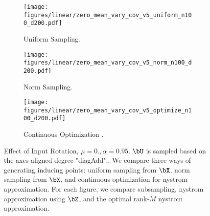 \begin{figure}[!htb]
\centering
\begin{subfigure}[b]{\textwidth}
       \texttt{[image: figures/linear/zero\_mean\_vary\_cov\_v5\_uniform\_n100\_d200.pdf]}
       \caption{Uniform Sampling.}
      \end{subfigure}
      \hspace{2em}
\begin{subfigure}[b]{\textwidth}
       \texttt{[image: figures/linear/zero\_mean\_vary\_cov\_v5\_norm\_n100\_d200.pdf]}
       \caption{Norm Sampling.}
      \end{subfigure}
      \hspace{2em}
\begin{subfigure}[b]{\textwidth}
       \texttt{[image: figures/linear/zero\_mean\_vary\_cov\_v5\_optimize\_n100\_d200.pdf]}
       \caption{Continuous Optimization .}
      \end{subfigure}
      \hspace{2em}
\caption{Effect of Input Rotation, $\mu=0., \alpha=0.95$. $\bU$ is sampled based on the axes-aligned degree "diagAdd".. We compare three ways of generating inducing points: uniform sampling from $\bX$, norm sampling from $\bX$, and continuous optimization for nystrom approximation. For each figure, we compare subsampling, nystrom approximation using $\bZ$, and the optimal rank-$M$ nystrom approximation.}
\end{figure}



%
%

